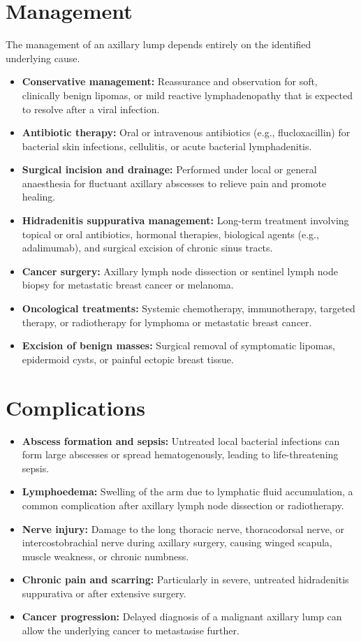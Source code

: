 \section*{Management}
The management of an axillary lump depends entirely on the identified underlying cause.
\begin{itemize}
    \item \textbf{Conservative management:} Reassurance and observation for soft, clinically benign lipomas, or mild reactive lymphadenopathy that is expected to resolve after a viral infection.
    \item \textbf{Antibiotic therapy:} Oral or intravenous antibiotics (e.g., flucloxacillin) for bacterial skin infections, cellulitis, or acute bacterial lymphadenitis.
    \item \textbf{Surgical incision and drainage:} Performed under local or general anaesthesia for fluctuant axillary abscesses to relieve pain and promote healing.
    \item \textbf{Hidradenitis suppurativa management:} Long-term treatment involving topical or oral antibiotics, hormonal therapies, biological agents (e.g., adalimumab), and surgical excision of chronic sinus tracts.
    \item \textbf{Cancer surgery:} Axillary lymph node dissection or sentinel lymph node biopsy for metastatic breast cancer or melanoma.
    \item \textbf{Oncological treatments:} Systemic chemotherapy, immunotherapy, targeted therapy, or radiotherapy for lymphoma or metastatic breast cancer.
    \item \textbf{Excision of benign masses:} Surgical removal of symptomatic lipomas, epidermoid cysts, or painful ectopic breast tissue.
\end{itemize}

\section*{Complications}
\begin{itemize}
    \item \textbf{Abscess formation and sepsis:} Untreated local bacterial infections can form large abscesses or spread hematogenously, leading to life-threatening sepsis.
    \item \textbf{Lymphoedema:} Swelling of the arm due to lymphatic fluid accumulation, a common complication after axillary lymph node dissection or radiotherapy.
    \item \textbf{Nerve injury:} Damage to the long thoracic nerve, thoracodorsal nerve, or intercostobrachial nerve during axillary surgery, causing winged scapula, muscle weakness, or chronic numbness.
    \item \textbf{Chronic pain and scarring:} Particularly in severe, untreated hidradenitis suppurativa or after extensive surgery.
    \item \textbf{Cancer progression:} Delayed diagnosis of a malignant axillary lump can allow the underlying cancer to metastasise further.
\end{itemize}

